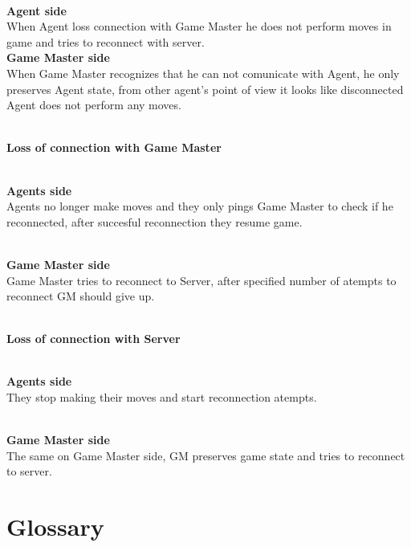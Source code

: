 \documentclass[11pt,a4paper]{article}
\begin{document}
\\{\bf Agent side}\\
When Agent loss connection with Game Master he does not perform moves in game and tries to reconnect with server.
\\{\bf Game Master side}\\
When Game Master recognizes that he can not comunicate with Agent, he only preserves Agent state, from other agent's point of view it looks like disconnected Agent does not perform any moves.

\begin{center}
\\{\bf Loss of connection with Game Master}\\
\end{center}
\\{\bf Agents side}\\
Agents no longer make moves and they only pings Game Master to check if he reconnected, after succesful reconnection they resume game.

\\{\bf Game Master side}\\
Game Master tries to reconnect to Server, after specified number of atempts to reconnect GM should give up.


\begin{center}
\\{\bf Loss of connection with Server}\\
\end{center}

\\{\bf Agents side}\\
They stop making their moves and start reconnection atempts.

\\{\bf Game Master side}\\
The same on Game Master side, GM preserves game state and tries to reconnect to server.


\section{Glossary}
\end{document}
